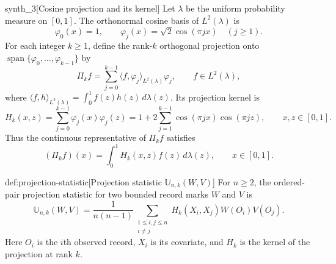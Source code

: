 \begin{definitionv}{synth_3}[Cosine projection and its kernel]
Let \(\lambda\) be the uniform probability measure on \([0,1]\). The orthonormal cosine basis of \(L^2(\lambda)\) is
\[
\varphi_0(x)=1,\qquad
\varphi_j(x)=\sqrt{2}\cos(\pi jx)\quad(j\ge1).
\]
For each integer \(k\ge1\), define the rank-\(k\) orthogonal projection onto \(\operatorname{span}\{\varphi_0,\ldots,\varphi_{k-1}\}\) by
\[
\Pi_k f
=\sum_{j=0}^{k-1}\langle f,\varphi_j\rangle_{L^2(\lambda)}\varphi_j,
\qquad f\in L^2(\lambda),
\]
where \(\langle f,h\rangle_{L^2(\lambda)}=\int_0^1 f(z)h(z)\,d\lambda(z)\). Its projection kernel is
\[
H_k(x,z)=\sum_{j=0}^{k-1}\varphi_j(x)\varphi_j(z)
=1+2\sum_{j=1}^{k-1}\cos(\pi jx)\cos(\pi jz),
\qquad x,z\in[0,1].
\]
Thus the continuous representative of \(\Pi_k f\) satisfies
\[
(\Pi_k f)(x)=\int_0^1 H_k(x,z)f(z)\,d\lambda(z),
\qquad x\in[0,1].
\]
\end{definitionv}

\begin{definitionv}{def:projection-statistic}[Projection statistic $\mathbb U_{n,k}(W,V)$]
For \(n\ge2\), the ordered-pair projection statistic for two bounded record marks \(W\) and \(V\) is
\[
\mathbb U_{n,k}(W,V)
=
\frac{1}{n(n-1)}
\sum_{\substack{1\le i,j\le n\\ i\ne j}}
H_k(X_i,X_j)W(O_i)V(O_j).
\]
Here \(O_i\) is the \(i\)th observed record, \(X_i\) is its covariate, and \(H_k\) is the kernel of the projection at rank \(k\).
\end{definitionv}

